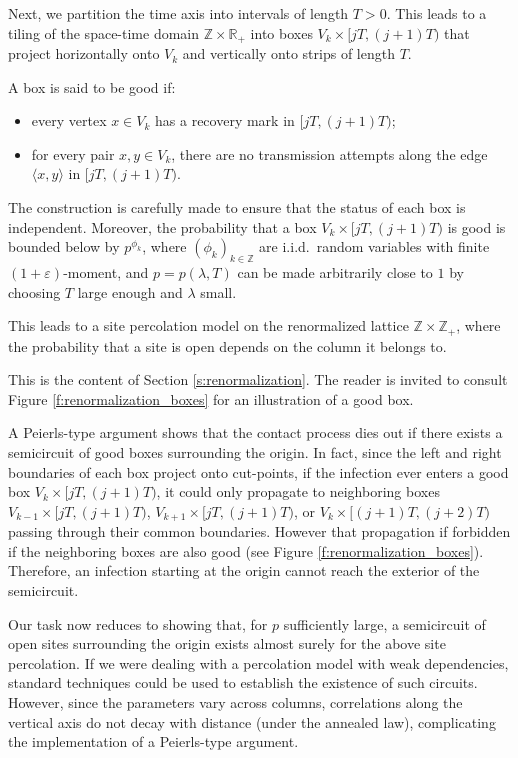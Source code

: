 \documentclass[a4paper,oneside,12pt]{amsart}
\theoremstyle{plain}
\theoremstyle{definition}
\theoremstyle{remark}
\begin{document}
Next, we partition the time axis into intervals of length $T > 0$.
This leads to a tiling of the space-time domain $\mathbb{Z} \times \mathbb{R}_+$ into boxes \(V_k \times [jT, (j+1)T)\) that project horizontally onto $V_k$ and vertically onto strips of length $T$.

A box is said to be good if:
\begin{itemize}
\item every vertex $x \in V_k$ has a recovery mark in $[jT, (j+1)T)$;
\item for every pair $x, y \in V_k$, there are no transmission attempts along the edge $\langle x, y \rangle$ in $[jT, (j+1)T)$.
\end{itemize}

The construction is carefully made to ensure that the status of each box is independent.
Moreover, the probability that a box \(V_k \times [jT, (j+1)T)\) is good is bounded below by $p^{\phi_k}$, where $(\phi_k)_{k\in\mathbb{Z}}$ are i.i.d.\ random variables with finite $(1+\varepsilon)$-moment, and $p = p(\lambda, T)$ can be made arbitrarily close to $1$ by choosing $T$ large enough and $\lambda$ small.

This leads to a site percolation model on the renormalized lattice $\mathbb{Z} \times \mathbb{Z}_+$, where the probability that a site is open depends on the column it belongs to.

This is the content of Section \ref{s:renormalization}.
The reader is invited to consult Figure \ref{f:renormalization_boxes} for an illustration of a good box.
\medskip

 A Peierls-type argument shows that the contact process dies out if there exists a semicircuit of good boxes surrounding the origin.
In fact, since the left and right boundaries of each box project onto cut-points, if the infection ever enters a good box \(V_k \times [jT, (j+1)T)\), it could only propagate to neighboring boxes $V_{k-1} \times [jT, (j+1)T)$, \(V_{k+1} \times [jT, (j+1)T)\), or $V_k \times [(j+1)T, (j+2)T)$ passing through their common boundaries.
However that propagation if forbidden if the neighboring boxes are also good (see Figure \ref{f:renormalization_boxes}).
Therefore, an infection starting at the origin  cannot reach the exterior of the semicircuit.

Our task now reduces to showing that, for $p$ sufficiently large, a semicircuit of open sites surrounding the origin exists almost surely for the above site percolation.
If we were dealing with a percolation model with weak dependencies, standard techniques could be used to establish the existence of such circuits.
However, since the parameters vary across columns, correlations along the vertical axis do not decay with distance (under the annealed law), complicating the implementation of a Peierls-type argument.
\medskip
\end{document}
